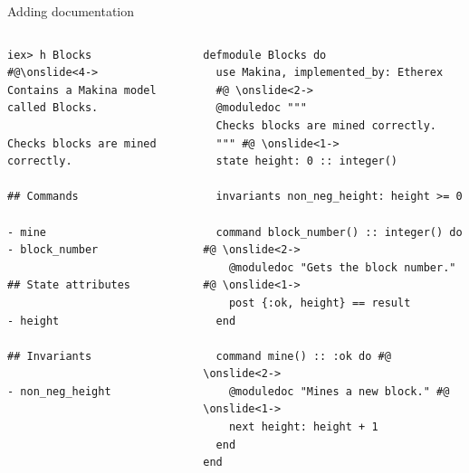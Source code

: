 \documentclass[aspectratio=169, 10pt, handout]{beamer}
\begin{document}
\begin{frame}[label={sec:org965f472},fragile]{Adding documentation}
 \begin{columns}
\begin{column}{0.48\columnwidth}
\lstset{language=bash,label= ,caption= ,captionpos=b,numbers=none,style=shell}
\begin{lstlisting}
iex> h Blocks
#@\onslide<4->
Contains a Makina model called Blocks.

Checks blocks are mined correctly.

## Commands

- mine
- block_number

## State attributes

- height

## Invariants

- non_neg_height
\end{lstlisting}
\end{column}

\begin{column}{0.48\columnwidth}
\lstset{language=elixir,label= ,caption= ,captionpos=b,numbers=none,style=display}
\begin{lstlisting}
defmodule Blocks do
  use Makina, implemented_by: Etherex
  #@ \onslide<2->
  @moduledoc """
  Checks blocks are mined correctly.
  """ #@ \onslide<1->
  state height: 0 :: integer()

  invariants non_neg_height: height >= 0

  command block_number() :: integer() do #@ \onslide<2->
    @moduledoc "Gets the block number." #@ \onslide<1->
    post {:ok, height} == result
  end

  command mine() :: :ok do #@ \onslide<2->
    @moduledoc "Mines a new block." #@ \onslide<1->
    next height: height + 1
  end
end
\end{lstlisting}
\end{column}
\end{columns}
\end{frame}
\end{document}

